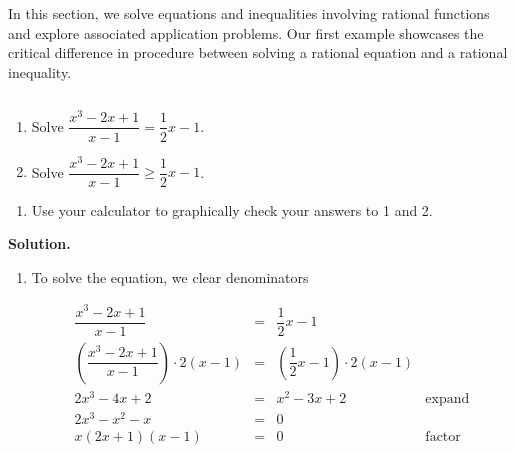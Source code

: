 
\setcounter{footnote}{0}

\label{RationalIneq}

In this section, we solve equations and inequalities involving rational functions and explore associated application problems. Our first example showcases the critical difference in procedure between solving a rational equation and a rational inequality.

\begin{ex}  $~$

\begin{multicols}{2}
\begin{enumerate}

\item  Solve $\dfrac{x^3-2x+1}{x-1} = \dfrac{1}{2}x-1$.

\item  Solve $\dfrac{x^3-2x+1}{x-1} \geq \dfrac{1}{2}x-1$.

\setcounter{HW}{\value{enumi}}
\end{enumerate}
\end{multicols}

\begin{enumerate}
\setcounter{enumi}{\value{HW}}

\item  Use your calculator to graphically check your answers to 1 and 2.

\end{enumerate}

{ \bf Solution.} 

\begin{enumerate}

\item  To solve the equation, we clear denominators

\[ \begin{array}{rclr}

\dfrac{x^3-2x+1}{x-1} & = & \dfrac{1}{2}x-1 & \\ [10pt]

\left(\dfrac{x^3-2x+1}{x-1}\right) \cdot 2(x-1) & = & \left( \dfrac{1}{2}x-1 \right) \cdot 2(x-1) & \\ [10pt]

2x^3 - 4x + 2 & = & x^2-3x+2 & \mbox{expand} \\

2x^3 -x^2 - x & = & 0 & \\

x(2x+1)(x-1) & = & 0 & \mbox{factor}\\


\end{array}\]
\end{enumerate}
\end{ex}
